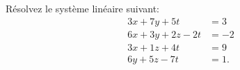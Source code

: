 \begin{exercice}\label{exoMatlab0033}

Résolvez le système linéaire suivant:
\begin{align*}
3x+7y+5t&=3 \\
6x+3y+2z-2t&=-2 \\
3x+1z+4t&=9 \\
6y+5z-7t&=1 .
\end{align*}

\end{exercice}

